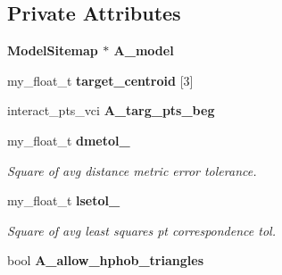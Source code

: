 \subsection*{Private Attributes}
\begin{CompactItemize}
\item 
\bf{Model\-Sitemap} $\ast$ \textbf{A\_\-model}\label{classASCbase_1_1MatchTriangles_4a2674b892098a9041d2d64240545d3d}

\item 
my\_\-float\_\-t \textbf{target\_\-centroid} [3]\label{classASCbase_1_1MatchTriangles_3c8d67e4f6f23bb114deaffd0e983c06}

\item 
interact\_\-pts\_\-vci \textbf{A\_\-targ\_\-pts\_\-beg}\label{classASCbase_1_1MatchTriangles_db2be75b7d41089ed59a31b0fd6ab4d0}

\item 
my\_\-float\_\-t \bf{dmetol\_}\label{classASCbase_1_1MatchTriangles_285278f41b70244a22984cf328522494}

\begin{CompactList}\small\item\em Square of avg distance metric error tolerance. \item\end{CompactList}\item 
my\_\-float\_\-t \bf{lsetol\_}\label{classASCbase_1_1MatchTriangles_4f725552c68b6de6e1d49a9796a3165b}

\begin{CompactList}\small\item\em Square of avg least squares pt correspondence tol. \item\end{CompactList}\item 
bool \textbf{A\_\-allow\_\-hphob\_\-triangles}\label{classASCbase_1_1MatchTriangles_0987b2902ceeac3e785e3a44db49f6f0}

\end{CompactItemize}
